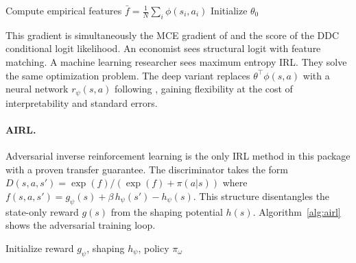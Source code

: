 \begin{algorithm}[H]
\DontPrintSemicolon
\caption{MCE-IRL \citep{ziebart2010}}
\label{alg:mceirl}
Compute empirical features $\bar f = \frac{1}{N}\sum_i \phi(s_i, a_i)$\;
Initialize $\theta_0$\;
\end{algorithm}

This gradient is simultaneously the MCE gradient of \citet{ziebart2010} and the score of the DDC conditional logit likelihood.
An economist sees structural logit with feature matching.
A machine learning researcher sees maximum entropy IRL.
They solve the same optimization problem.
The deep variant replaces $\theta^\top\phi(s,a)$ with a neural network $r_\psi(s,a)$ following \citet{wulfmeier2016}, gaining flexibility at the cost of interpretability and standard errors.

\paragraph{AIRL.}
Adversarial inverse reinforcement learning \citep{fu2018} is the only IRL method in this package with a proven transfer guarantee.
The discriminator takes the form $D(s,a,s') = \exp(f)/(\exp(f) + \pi(a|s))$ where $f(s,a,s') = g_\psi(s) + \beta\, h_\psi(s') - h_\psi(s)$.
This structure disentangles the state-only reward $g(s)$ from the shaping potential $h(s)$.
Algorithm~\ref{alg:airl} shows the adversarial training loop.

\begin{algorithm}[H]
\DontPrintSemicolon
\caption{AIRL \citep{fu2018}}
\label{alg:airl}
Initialize reward $g_\psi$, shaping $h_\psi$, policy $\pi_\omega$\;
\end{algorithm}

